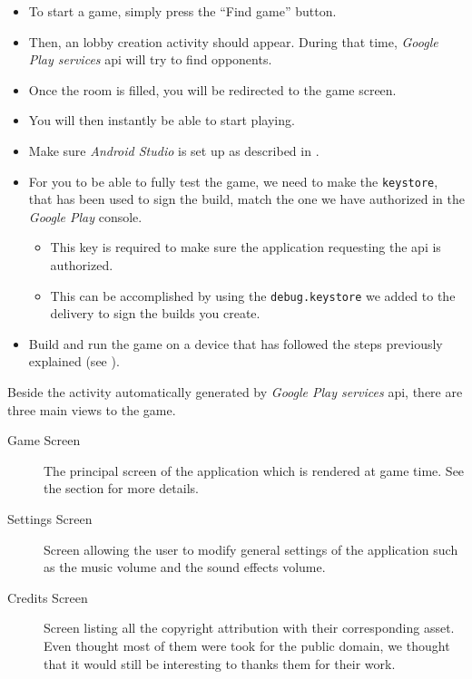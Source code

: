 
\begin{itemize}
	\item To start a game, simply press the “Find game” button.
  \item Then, an lobby creation activity should appear. During that time, \textit{Google Play services} \gls{api} will try to find opponents.
  \item Once the room is filled, you will be redirected to the game screen.
	\item You will then instantly be able to start playing.
\end{itemize}

\begin{itemize}
	\item Make sure \textit{Android Studio} is set up as described in .
	\item For you to be able to fully test the game, we need to make the \texttt{keystore}, that has been used to sign the build, match the one we have authorized in the \textit{Google Play} console.
	\begin{itemize}
		\item This key is required to make sure the application requesting the \gls{api} is authorized.
		\item This can be accomplished by using the \texttt{debug.keystore} we added to the delivery to sign the builds you create.
	\end{itemize}
	\item Build and run the game on a device that has followed the steps previously explained (see ).
\end{itemize}

Beside the activity automatically generated by \textit{Google Play services} \gls{api}, there are three main views to the game.
\begin{description}
	\item [Game Screen] The principal screen of the application which is rendered at game time. See the section  for more details.
	\item [Settings Screen] Screen allowing the user to modify general settings of the application such as the music volume and the sound effects volume.
	\item [Credits Screen] Screen listing all the copyright attribution with their corresponding asset. Even thought most of them were took for the public domain, we thought that it would still be interesting to thanks them for their work.
\end{description}

